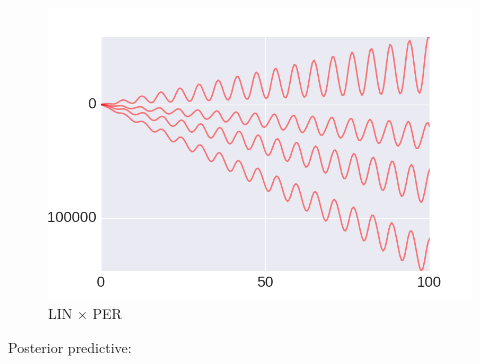     \begin{subfigure}[b]{0.3\textwidth}
        \includegraphics[width=\textwidth]{figs/composition/composition_demo_LINxPER_prior.png}
        \caption{LIN $\times$ PER}
    \end{subfigure} \vspace{4mm} 

Posterior predictive:

